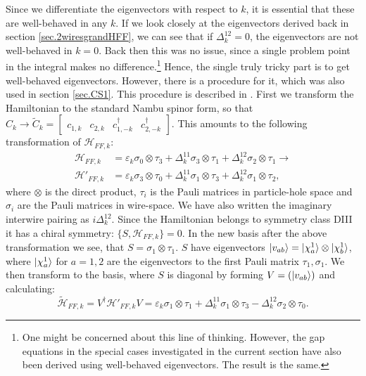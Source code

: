 Since we differentiate the eigenvectors with respect to $k$, it is essential that these are well-behaved in any $k$. If we look closely at the eigenvectors derived back in section \ref{sec.2wiresgrandHFF}, we can see that if $\Delta^{12}_k = 0$, the eigenvectors are not well-behaved in $k = 0$. Back then this was no issue, since a single problem point in the integral makes no difference.\footnote{One might be concerned about this line of thinking. However, the gap equations in the special cases investigated in the current section have also been derived using well-behaved eigenvectors. The result is the same.} Hence, the single truly tricky part is to get well-behaved eigenvectors. However, there is a procedure for it, which was also used in section \ref{sec.CS1}. This procedure is described in \cite{Ryu.Topology}. First we transform the Hamiltonian to the standard Nambu spinor form, so that $C_k \to \tilde{C}_k = \begin{bmatrix} c_{1,k} & c_{2,k} & c^\dagger_{1,-k} & c^\dagger_{2,-k}  \end{bmatrix}$. This amounts to the following transformation of $\mathcal{H}_{FF,k}$:
\begin{align}
\mathcal{H}_{FF,k} &= \varepsilon_k \sigma_0 \otimes \tau_3 + \Delta^{11}_k \sigma_3 \otimes \tau_1 + \Delta^{12}_k \sigma_2 \otimes \tau_1 \to \nonumber \\
\mathcal{H}'_{FF,k} &= \varepsilon_k \sigma_3 \otimes \tau_0 + \Delta^{11}_k \sigma_1 \otimes \tau_3 + \Delta^{12}_k \sigma_1 \otimes \tau_2, \nonumber 
\end{align}
where $\otimes$ is the direct product, $\tau_i$ is the Pauli matrices in particle-hole space and $\sigma_i$ are the Pauli matrices in wire-space. We have also written the imaginary interwire pairing as $i\Delta^{12}_k$. Since the Hamiltonian belongs to symmetry class DIII it has a chiral symmetry: $\{S, \mathcal{H}_{FF,k}\} = 0$. In the new basis after the above transformation we see, that $S = \sigma_1\otimes \tau_1$. $S$ have eigenvectors $\ket{v_{ab}} = \ket{\chi^{1}_a}\otimes \ket{\chi^{1}_b}$, where $\ket{\chi^{1}_a}$ for $a = 1,2$ are the eigenvectors to the first Pauli matrix $\tau_1, \sigma_1$. We then transform to the basis, where $S$ is diagonal by forming $V = (\ket{v_{ab}})$ and calculating:
\begin{equation}
\tilde{\mathcal{H}}_{FF,k} = V^\dagger\mathcal{H}'_{FF,k}V = \varepsilon_k \sigma_1\otimes \tau_1 + \Delta^{11}_k \sigma_1\otimes\tau_3 - \Delta^{12}_k\sigma_2\otimes\tau_0. \nonumber 
\end{equation}
